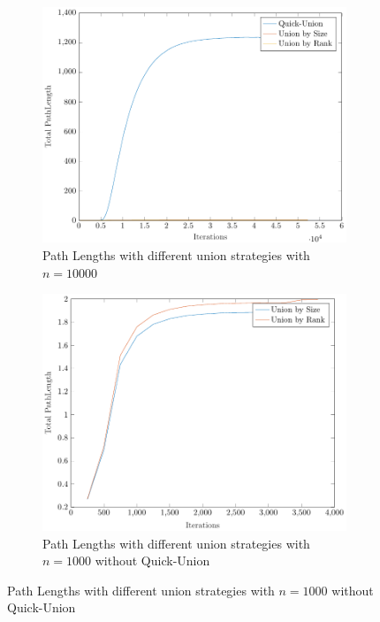 \begin{figure}[ht]
\begin{subfigure}{0.32\textwidth}
    \end{subfigure}%
    \hfill
    \begin{subfigure}{0.32\textwidth}
        \centering
        \includegraphics[width=\textwidth]{../images/plotNCFull10000_PathLength.pdf}
        \caption{Path Lengths with different union strategies with $n = 10000$}
    \end{subfigure}
    \begin{subfigure}{0.32\textwidth}
        \centering
        \includegraphics[width=\textwidth]{../images/plotNCNonFull1000_PathLength.pdf}
        \caption{Path Lengths with different union strategies with $n = 1000$ without Quick-Union}

\end{subfigure}
\end{figure}
